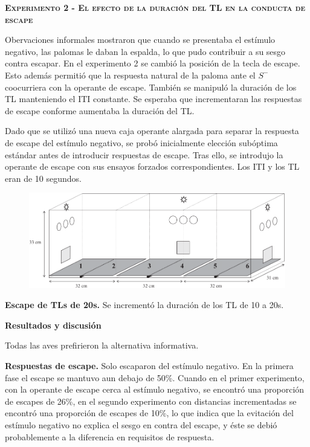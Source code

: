\documentclass[a4paper,12pt]{article}
\begin{document}
{\scshape\bfseries Experimento 2 -  El efecto de la duración del TL en la conducta de escape}

Obervaciones informales mostraron que cuando se presentaba el estímulo negativo, las palomas le daban la espalda, lo que pudo contribuir a su sesgo contra escapar. En el experimento 2 se cambió la posición de la tecla de escape. Esto además permitió que la respuesta natural de la paloma ante el $S^-$ coocurriera con la operante de escape. También se manipuló la duración de los TL manteniendo el ITI constante. Se esperaba que incrementaran las respuestas de escape conforme aumentaba la duración del TL.

Dado que se utilizó una nueva caja operante alargada para separar la respuesta de escape del estímulo negativo, se probó inicialmente elección subóptima estándar antes de introducir respuestas de escape. Tras ello, se introdujo la operante de escape con sus ensayos forzados correspondientes. Los ITI y los TL eran de 10 segundos.

\begin{figure}[ht]
	\begin{center}
		\includegraphics[scale=0.5]{Fortes.png}
	\end{center}
\end{figure}	

{\bfseries Escape de TLs de 20s.} Se incrementó la duración de los TL de 10 a 20s. 

{\bfseries Resultados y discusión}

Todas las aves prefirieron la alternativa informativa.

{\bfseries Respuestas de escape.} Solo escaparon del estímulo negativo. En la primera fase el escape se mantuvo aun debajo de 50\%. Cuando en el primer experimento, con la operante de escape cerca al estímulo negativo, se encontró una proporción de escapes de 26\%, en el segundo experimento con distancias incrementadas se encontró una proporción de escapes de 10\%, lo que indica que la evitación del estímulo negativo no explica el sesgo en contra del escape, y éste se debió probablemente a la diferencia en requisitos de respuesta.
\end{document}
